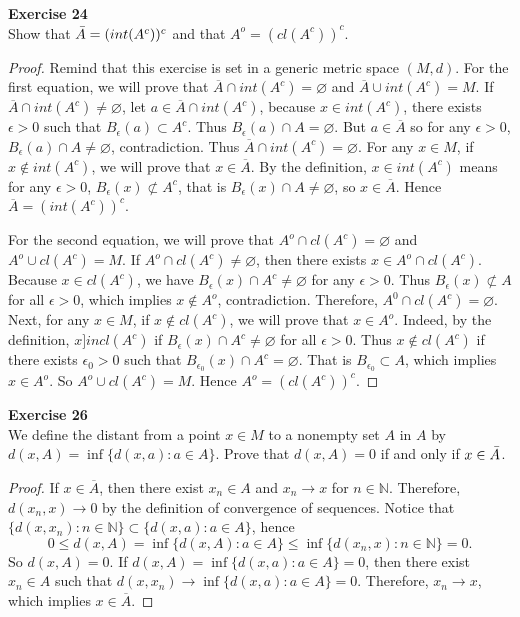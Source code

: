 \documentclass[12pt, a4paper]{article}
\theoremstyle{plain}
\newcommand{\N}{\mathbb{N}}
\newenvironment{exercise}[2][Exercise]
    { \begin{mdframed}[backgroundcolor=gray!20] \textbf{#1 #2} \\}
    {  \end{mdframed}}
\begin{document}
\begin{exercise}{24}
Show that $\Bar{A}=(int(A^c))^c$ and that $A^o=(cl(A^c))^c$.
\end{exercise}
    \begin{proof}
    Remind that this exercise is set in a generic metric space $(M,d)$. For the first equation, we will prove that $\overline{A}\cap int(A^c)=\varnothing$ and $\overline{A}\cup int(A^c)=M$. If $\overline{A}\cap int(A^c)\neq \varnothing$, let $a\in \overline{A}\cap int(A^c)$, because $x\in int(A^c)$, there exists $\epsilon>0$ such that $B_\epsilon(a)\subset A^c$. Thus $B_\epsilon(a)\cap A=\varnothing$. But $a\in \overline{A}$ so for any $\epsilon>0$, $B_\epsilon(a)\cap A\neq \varnothing$, contradiction. Thus $\overline{A}\cap int(A^c)=\varnothing$. For any $x\in M$, if $x\notin int(A^c)$, we will prove that $x\in\overline{A}$. By the definition, $x\in int(A^c)$ means for any $\epsilon>0$, $B_\epsilon(x)\not\subset A^c$, that is $B_\epsilon(x)\cap A\neq \varnothing$, so $x\in \overline{A}$. Hence $\overline{A}=(int(A^c))^c$.
    
    For the second equation, we will prove that $A^o\cap cl(A^c)=\varnothing$ and $A^o\cup cl(A^c)=M$. If $A^o\cap cl(A^c)\neq \varnothing$, then there exists $x\in A^o\cap cl(A^c)$. Because $x\in cl(A^c)$, we have $B_\epsilon(x)\cap A^c\neq \varnothing$ for any $\epsilon>0$. Thus $B_\epsilon(x)\not\subset A$ for all $\epsilon>0$, which implies $x\notin A^o$, contradiction. Therefore, $A^0\cap cl(A^c)=\varnothing$. Next, for any $x\in M$, if $x\notin cl(A^c)$, we will prove that $x\in A^o$. Indeed, by the definition, $x]in cl(A^c)$ if $B_\epsilon(x)\cap A^c\neq \varnothing$ for all $\epsilon>0$. Thus $x\notin cl(A^c)$ if there exists $\epsilon_0>0$ such that $B_{\epsilon_0}(x)\cap A^c=\varnothing$. That is $B_{\epsilon_0}\subset A$, which implies $x\in A^o$. So $A^o\cup cl(A^c)=M$. Hence $A^o=(cl(A^c))^c$.
    \end{proof}

\begin{exercise}{26}
We define the distant from a point $x\in M$ to a nonempty set $A$ in $A$ by $d(x,A)=\inf\{d(x,a):a\in A\}$. Prove that $d(x,A)=0$ if and only if $x\in\Bar{A}$.
\end{exercise}
    \begin{proof}
    If $x\in\overline{A}$, then there exist $x_n\in A$ and $x_n\rightarrow x$ for $n\in\N$. Therefore, $d(x_n,x)\rightarrow 0$ by the definition of convergence of sequences. Notice that $\{d(x,x_n):n\in\N\}\subset \{d(x,a):a\in A\}$, hence 
    \[
    0\leq d(x,A) =\inf\{d(x,A):a\in A\}\leq \inf\{d(x_n,x):n\in\N\}=0.
    \]
    So $d(x,A)=0$. If $d(x,A)=\inf\{d(x,a):a\in A\}=0$, then there exist $x_n\in A$ such that $d(x,x_n)\rightarrow \inf\{d(x,a):a\in A\}=0$. Therefore, $x_n\rightarrow x$, which implies $x\in \overline{A}$.
    \end{proof}
\end{document}
